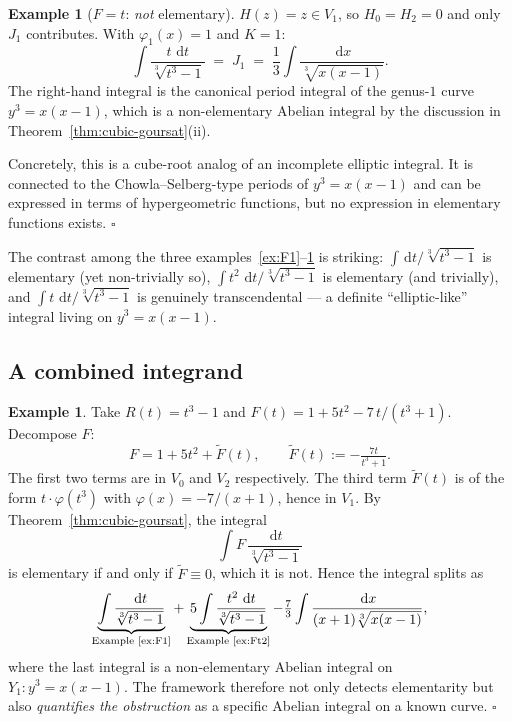 \documentclass[11pt,a4paper]{article}
\theoremstyle{plain}
\theoremstyle{definition}
\newtheorem{example}[theorem]{Example}
\theoremstyle{remark}
\renewcommand{\d}{\,\mathrm{d}}
\begin{document}
\begin{example}[$F=t$: \emph{not} elementary]\label{ex:Ft}
$H(z)=z\in V_1$, so $H_0=H_2=0$ and only $J_1$ contributes. With $\varphi_1(x)=1$ and $K=1$:
\[
  \int \frac{t\,\d t}{\sqrt[3]{t^3-1}} \;=\; J_1 \;=\; \frac{1}{3}\int \frac{\d x}{\sqrt[3]{x(x-1)}}.
\]
The right-hand integral is the canonical period integral of the genus-$1$ curve $y^3=x(x-1)$, which is a non-elementary Abelian integral by the discussion in Theorem~\ref{thm:cubic-goursat}(ii).

Concretely, this is a cube-root analog of an incomplete elliptic integral. It is connected to the Chowla--Selberg-type periods of $y^3=x(x-1)$ and can be expressed in terms of hypergeometric functions, but no expression in elementary functions exists. \hfill$\square$
\end{example}

The contrast among the three examples~\ref{ex:F1}--\ref{ex:Ft} is striking: $\int \d t/\sqrt[3]{t^3-1}$ is elementary (yet non-trivially so), $\int t^2\,\d t/\sqrt[3]{t^3-1}$ is elementary (and trivially), and $\int t\,\d t/\sqrt[3]{t^3-1}$ is genuinely transcendental --- a definite ``elliptic-like'' integral living on $y^3=x(x-1)$.

\subsection{A combined integrand}

\begin{example}\label{ex:combined}
Take $R(t)=t^3-1$ and $F(t) = 1 + 5t^2 - 7\,t/(t^3+1)$. Decompose $F$:
\[
  F = 1 + 5t^2 + \widetilde{F}(t), \qquad \widetilde{F}(t) := -\tfrac{7t}{t^3+1}.
\]
The first two terms are in $V_0$ and $V_2$ respectively. The third term $\widetilde{F}(t)$ is of the form $t\cdot\varphi(t^3)$ with $\varphi(x)=-7/(x+1)$, hence in $V_1$. By Theorem~\ref{thm:cubic-goursat}, the integral
\[
  \int F\,\frac{\d t}{\sqrt[3]{t^3-1}}
\]
is elementary if and only if $\widetilde{F} \equiv 0$, which it is not. Hence the integral splits as
\[
  \underbrace{\int \frac{\d t}{\sqrt[3]{t^3-1}}}_{\text{Example~\ref{ex:F1}}} + \underbrace{5\int \frac{t^2\,\d t}{\sqrt[3]{t^3-1}}}_{\text{Example~\ref{ex:Ft2}}} - \tfrac{7}{3}\int \frac{\d x}{(x+1)\sqrt[3]{x(x-1)}},
\]
where the last integral is a non-elementary Abelian integral on $Y_1\colon y^3=x(x-1)$. The framework therefore not only detects elementarity but also \emph{quantifies the obstruction} as a specific Abelian integral on a known curve.
\hfill$\square$
\end{example}
\end{document}
